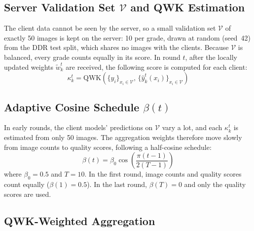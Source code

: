 \subsection{Server Validation Set $\mathcal{V}$ and QWK Estimation}

The client data cannot be seen by the server, so a small validation set
$\mathcal{V}$ of exactly 50 images is kept on the server: 10 per grade, drawn at
random (seed~42) from the DDR test split, which shares no images with the clients.
Because $\mathcal{V}$ is balanced, every grade counts equally in its score. In
round $t$, after the locally updated weights $\tilde{w}_k^t$ are received, the
following score is computed for each client:
\begin{equation}
\kappa_k^t =
\mathrm{QWK}\!\left(\{y_i\}_{x_i \in \mathcal{V}},\,
\{\hat{y}_k^t(x_i)\}_{x_i \in \mathcal{V}}\right)
\label{eq:serverqwk}
\end{equation}

\subsection{Adaptive Cosine Schedule $\beta(t)$}

In early rounds, the client models' predictions on $\mathcal{V}$ vary a lot, and
each $\kappa_k^t$ is estimated from only 50 images. The aggregation weights
therefore move slowly from image counts to quality scores, following a half-cosine
schedule:
\begin{equation}
\beta(t) = \beta_0 \cos\!\left(\frac{\pi (t - 1)}{2 (T - 1)}\right)
\label{eq:beta}
\end{equation}
where $\beta_0 = 0.5$ and $T = 10$. In the first round, image counts and quality
scores count equally ($\beta(1) = 0.5$). In the last round, $\beta(T) = 0$ and only
the quality scores are used.

\subsection{QWK-Weighted Aggregation}

